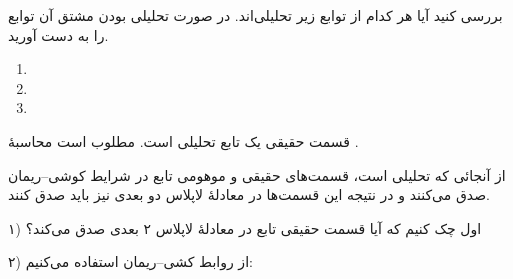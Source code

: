 \begin{EMexercise}{}

بررسی کنید آیا هر کدام از توابع زیر تحلیلی‌اند. در صورت تحلیلی بودن مشتق آن توابع را به دست آورید.

\begin{enumerate}
\def\labelenumi{\arabic{enumi}.}
\tightlist
\item
\item
\item
\end{enumerate}

\end{EMexercise}

\EMhold


\begin{EMexample}{}

 قسمت حقیقی یک تابع تحلیلی  است. مطلوب است محاسبهٔ .

از آنجائی که  تحلیلی است، قسمت‌های حقیقی و موهومی تابع در شرایط کوشی--ریمان صدق می‌کنند و در نتیجه این قسمت‌ها در معادلهٔ لاپلاس دو بعدی نیز باید صدق کنند.

۱) اول چک کنیم که آیا قسمت حقیقی تابع در معادلهٔ لاپلاس ۲ بعدی صدق می‌کند؟

۲) از روابط کشی--ریمان استفاده می‌کنیم:

\end{EMexample}

